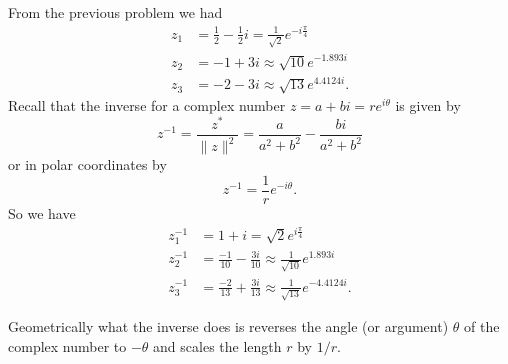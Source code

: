 \documentclass[12pt]{article} %
\begin{document}
\begin{solution}
From the previous problem we had
\begin{align*}
z_1 &= \frac{1}{2}-\frac{1}{2}i = \frac{1}{\sqrt{2}}e^{-i\frac{\pi}{4}}\\
z_2 &= -1 + 3i \approx \sqrt{10}e^{-1.893i}\\
z_3 &= -2 - 3i \approx \sqrt{13}{e^{4.4124i}}.
\end{align*}
Recall that the inverse for a complex number $z=a+bi=re^{i\theta}$ is given by
\[
z^{-1}=\frac{z^*}{\|z\|^2}=\frac{a}{a^2+b^2}-\frac{bi}{a^2+b^2}
\]
or in polar coordinates by
\[
z^{-1}=\frac{1}{r}e^{-i\theta}.
\]
So we have
\begin{align*}
    z_1^{-1} &= 1+i = \sqrt{2}e^{i\frac{\pi}{4}}\\
    z_2^{-1} &= \frac{-1}{10}-\frac{3i}{10} \approx \frac{1}{\sqrt{10}} e^{1.893i}\\
    z_3^{-1} &= \frac{-2}{13}+\frac{3i}{13} \approx \frac{1}{\sqrt{13}} e^{-4.4124i}.
\end{align*}
    \begin{center}
        \end{center}
    Geometrically what the inverse does is reverses the angle (or argument) $\theta$ of the complex number to $-\theta$ and scales the length $r$ by $1/r$. 
\end{solution}
\newpage
\end{document}
